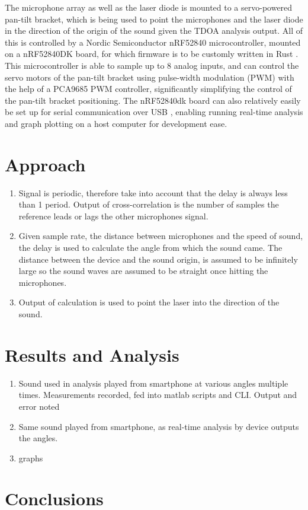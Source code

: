 \documentclass[a4paper]{article}
\begin{document}
The microphone array as well as the laser diode is mounted to a servo-powered pan-tilt bracket, which is being used to point the microphones and the laser diode in the direction of the origin of the sound given the TDOA analysis output. All of this is controlled by a Nordic Semiconductor nRF52840 microcontroller, mounted on a nRF52840DK board, for which firmware is to be customly written in Rust \cite{rust}. This microcontroller is able to sample up to 8 analog inputs, and can control the servo motors of the pan-tilt bracket using pulse-width modulation (PWM) \cite{GULYAEV20161529} with the help of a PCA9685 \cite{pca9685} PWM controller, significantly simplifying the control of the pan-tilt bracket positioning. The nRF52840dk board can also relatively easily be set up for serial communication over USB \cite{usb}, enabling running real-time analysis and graph plotting on a host computer for development ease.


\section{Approach}

\begin{enumerate}
    \item Signal is periodic, therefore take into account that the delay is always less than 1 period. Output of cross-correlation is the number of samples the reference leads or lags the other microphones signal.
    \item Given sample rate, the distance between microphones and the speed of sound, the delay is used to calculate the angle from which the sound came. The distance between the device and the sound origin, is assumed to be infinitely large so the sound waves are assumed to be straight once hitting the microphones.
    \item Output of calculation is used to point the laser into the direction of the sound.
\end{enumerate}

\section{Results and Analysis}
\begin{enumerate}

    \item Sound used in analysis played from smartphone at various angles multiple times. Measurements recorded, fed into matlab scripts and CLI. Output and error noted
    \item Same sound played from smartphone, as real-time analysis by device outputs the angles.
    \item graphs
\end{enumerate}




\section{Conclusions}




\end{document}
